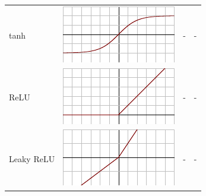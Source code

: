 \begin{tabular}{| p{25mm} | c | l | l |}
tanh & \begin{minipage}{.2\textwidth}
      \includegraphics[width=\textwidth]{tex/images/activation/tanh}
    \end{minipage} & - & - \\
    
ReLU & \begin{minipage}{.2\textwidth}
      \includegraphics[width=\textwidth]{tex/images/activation/relu}
    \end{minipage} & - & - \\
    
Leaky ReLU & \begin{minipage}{.2\textwidth}
      \includegraphics[width=\textwidth]{tex/images/activation/lrelu}
    \end{minipage} & - & -\\
    

\end{tabular}
